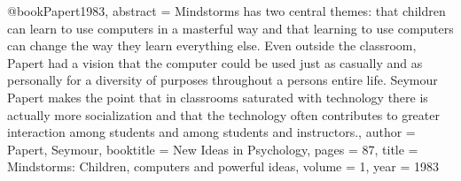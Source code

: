 
@book{Papert1983,
	abstract = {Mindstorms has two central themes: that children can learn to use computers in a masterful way and that learning to use computers can change the way they learn everything else. Even outside the classroom, Papert had a vision that the computer could be used just as casually and as personally for a diversity of purposes throughout a persons entire life. Seymour Papert makes the point that in classrooms saturated with technology there is actually more socialization and that the technology often contributes to greater interaction among students and among students and instructors.},
	author = {Papert, Seymour},
	booktitle = {New Ideas in Psychology},
	pages = {87},
	title = {{Mindstorms: Children, computers and powerful ideas}},
	volume = {1},
	year = {1983}
}

